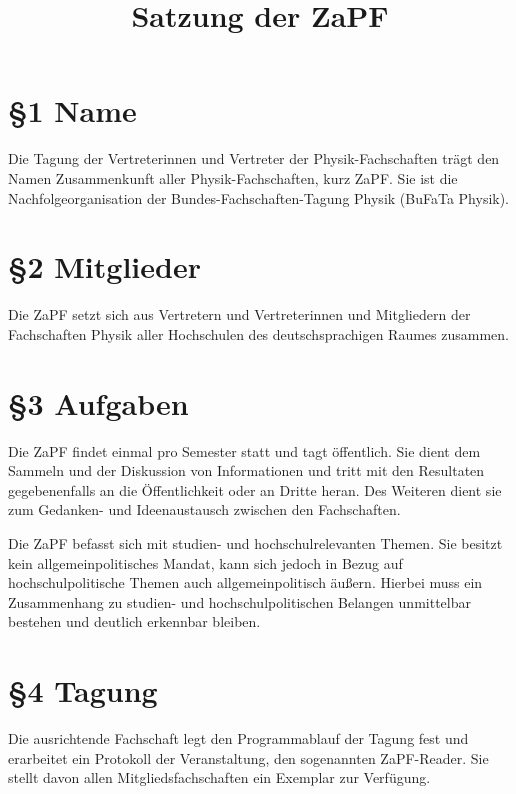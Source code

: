 \documentclass[12pt,oneside]{scrartcl}
\title{\phantomsection%
  Satzung der ZaPF%
  \label{satzung-der-zapf}}
\author{}
\date{}
\begin{document}
\maketitle


\section{§1 Name%
  \label{name}%
}

Die Tagung der Vertreterinnen und Vertreter der Physik-Fachschaften trägt den
Namen Zusammenkunft aller Physik-Fachschaften, kurz ZaPF.
Sie ist die Nachfolgeorganisation der Bundes-Fachschaften-Tagung Physik (BuFaTa Physik).


\section{§2 Mitglieder%
  \label{mitglieder}%
}

Die ZaPF setzt sich aus Vertretern und Vertreterinnen und Mitgliedern der
Fachschaften Physik aller Hochschulen des deutschsprachigen Raumes zusammen.


\section{§3 Aufgaben%
  \label{aufgaben}%
}

Die ZaPF findet einmal pro Semester statt und tagt öffentlich. Sie dient dem
Sammeln und der Diskussion von Informationen und tritt mit den Resultaten
gegebenenfalls an die Öffentlichkeit oder an Dritte heran.
Des Weiteren dient sie zum Gedanken- und Ideenaustausch zwischen den
Fachschaften.

Die ZaPF befasst sich mit studien- und hochschulrelevanten Themen. Sie besitzt
kein allgemeinpolitisches Mandat, kann sich jedoch in Bezug auf
hochschulpolitische Themen auch allgemeinpolitisch äußern. Hierbei muss ein
Zusammenhang zu studien- und hochschulpolitischen Belangen unmittelbar bestehen
und deutlich erkennbar bleiben.


\section{§4 Tagung%
  \label{tagung}%
}

Die ausrichtende Fachschaft legt den Programmablauf der Tagung fest und
erarbeitet ein Protokoll der Veranstaltung, den sogenannten ZaPF-Reader. Sie
stellt davon allen Mitgliedsfachschaften ein Exemplar zur Verfügung.
\end{document}
